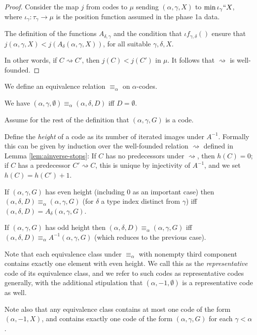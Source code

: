 \begin{proof}
  Consider the map $j$ from codes to $\mu$ sending $(\alpha,\gamma,X)$ to $\min \iota_\gamma``X$, where $\iota_\gamma : \tau_\gamma \to \mu$ is the  position function assumed in the phase 1a data.

  The definition of the functions $A_{\delta,\gamma}$ and the condition that $\iota f_{\gamma,\delta}()$ ensure that $j(\alpha,\gamma,X) < j(A_\delta(\alpha,\gamma,X))$, for all suitable $\gamma,\delta,X$.

  In other words, if $C \rightsquigarrow C'$, then $j(C) < j(C')$ in $\mu$.  It follows that $\rightsquigarrow$ is well-founded.
\end{proof}

\begin{definition}
\label {def:equiv-code}
We define an equivalence relation $\equiv_\alpha$ on $\alpha$-codes.

We have $(\alpha,\gamma,\emptyset) \equiv_\alpha (\alpha,\delta,D)$ iff $D=\emptyset$.

Assume for the rest of the definition that $(\alpha,\gamma,G)$ is a code.

Define the \emph{height} of a code as its number of iterated images under $A^{-1}$.  Formally this can be given by induction over the well-founded relation $\rightsquigarrow$ defined in Lemma \ref{lem:ainverse-stops}: If $C$ has no predecessors under $\rightsquigarrow$, then $h(C) = 0$; if $C$ has a predecessor $C' \rightsquigarrow C$, this is unique by injectivity of $A^{-1}$, and we set $h(C) = h(C') + 1$.

If $(\alpha,\gamma,G)$ has even height (including 0 as an important case)
then $(\alpha,\delta,D) \equiv_\alpha (\alpha,\gamma,G)$ (for $\delta$ a type index distinct from $\gamma$) iff
$(\alpha,\delta,D) = A_\delta(\alpha,\gamma,G)$.

If $(\alpha,\gamma,G)$ has odd height then $(\alpha,\delta,D) \equiv_\alpha (\alpha,\gamma,G)$ iff $(\alpha,\delta,D) \equiv_\alpha A^{-1}(\alpha,\gamma,G)$ (which reduces to the previous case).
\end{definition}

\begin{definition}
\label{def:representative-code}
Note that each equivalence class under $\equiv_\alpha$ with nonempty third component contains exactly one element with even height.  We call this as the \emph{representative} code of its equivalence class, and we refer to such codes as representative codes generally, with the additional stipulation that $(\alpha,-1,\emptyset)$ is a representative code as well.

Note also that any equivalence class contains at most one code of the form $(\alpha,-1,X)$, and contains exactly one code of the form $(\alpha,\gamma,G)$ for each $\gamma < \alpha$.
\end{definition}

